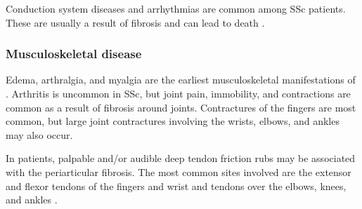 Conduction system diseases and arrhythmias are common among SSc patients.
These are usually a result of fibrosis and can lead to death
\citep{overviewSSc}.

\subsubsection{Musculoskeletal disease}

Edema, arthralgia, and myalgia are the earliest musculoskeletal manifestations
of \dcSSc. Arthritis is uncommon in SSc, but joint pain, immobility, and
contractions are common as a result of fibrosis around joints. Contractures of
the fingers are most common, but large joint contractures involving the
wrists, elbows, and ankles may also occur.

In \dcSSc patients, palpable and/or audible deep tendon friction rubs may be
associated with the periarticular fibrosis. The most common sites involved are
the extensor and flexor tendons of the fingers and wrist and tendons over the
elbows, knees, and ankles \citep{overviewSSc}.

